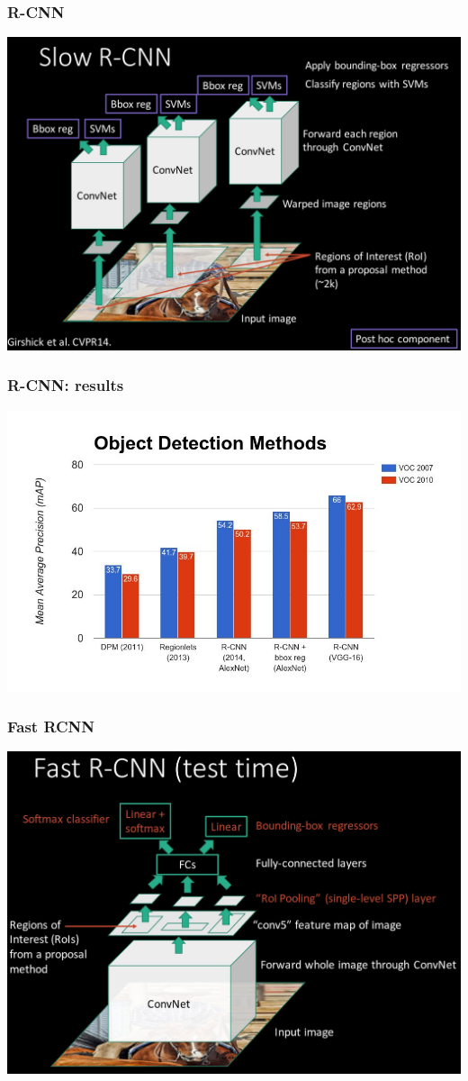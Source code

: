 \documentclass[xcolor=dvipsnames]{beamer}
\begin{document}
\begin{frame}
  \frametitle{R-CNN}
  \includegraphics[height=.8\textheight]{rcnn}
\end{frame}

\begin{frame}
  \frametitle{R-CNN: results}
  \includegraphics[width=.8\textwidth]{rcnn-results}
\end{frame}

\begin{frame}
  \frametitle{Fast RCNN}
  \includegraphics[height=.8\textheight]{fast-rcnn-test}
\end{frame}
\end{document}
